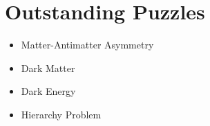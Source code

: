 %
%
%
%
%
%
%
%
%
%
%
%
%

\section{Outstanding Puzzles}
\begin{itemize}
    \item Matter-Antimatter Asymmetry
    \item Dark Matter
    \item Dark Energy
    \item Hierarchy Problem
\end{itemize}


